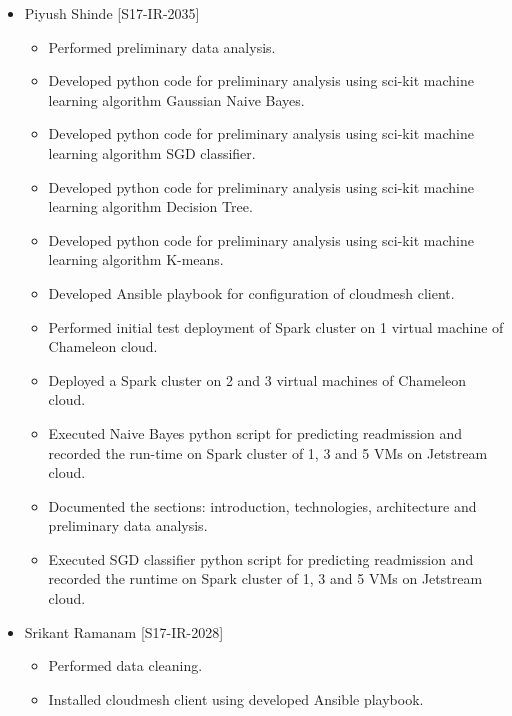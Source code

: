 \documentclass[9pt,twocolumn,twoside]{../../styles/osajnl}
\begin{document}
\begin{appendices}
\begin{itemize}
\begin{itemize}
    \end{itemize}
    \item Piyush Shinde [S17-IR-2035]
    \begin{itemize}
        \item Performed preliminary data analysis.
\item Developed python code for preliminary analysis using sci-kit machine learning algorithm Gaussian Naive Bayes.
\item Developed python code for preliminary analysis using sci-kit machine learning algorithm SGD classifier.
\item Developed python code for preliminary analysis using sci-kit machine learning algorithm Decision Tree.
\item Developed python code for preliminary analysis using sci-kit machine learning algorithm K-means.
\item Developed Ansible playbook for configuration of cloudmesh client.
\item Performed initial test deployment of Spark cluster on 1 virtual machine of Chameleon cloud.
\item Deployed a Spark cluster on 2 and 3 virtual machines of Chameleon cloud.
\item Executed Naive Bayes python script for predicting readmission and recorded the run-time on Spark cluster of 1, 3 and 5 VMs on Jetstream cloud.
\item Documented the sections: introduction, technologies, architecture and preliminary data analysis. 
\item Executed SGD classifier python script for predicting readmission and recorded the runtime on Spark cluster of 1, 3 and 5 VMs  on Jetstream cloud.
    \end{itemize}
    \item Srikant Ramanam [S17-IR-2028]
    \begin{itemize}
       \item Performed data cleaning.
      \item Installed cloudmesh client using developed Ansible playbook.
       

\end{itemize}
\end{itemize}
\end{appendices}
\end{document}

